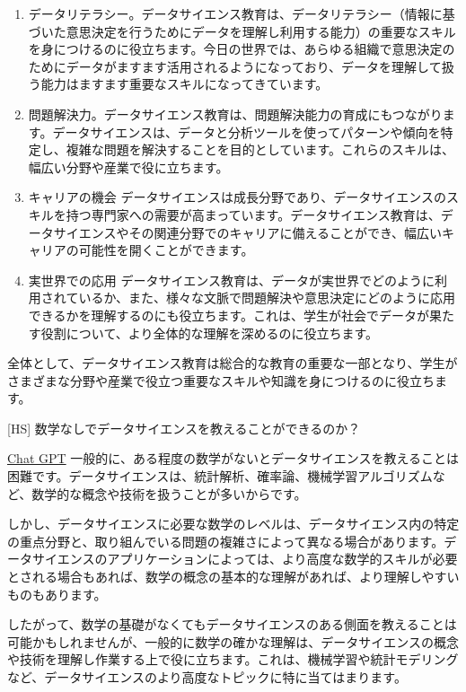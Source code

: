\documentclass[
]{book}
\theoremstyle{definition}
\theoremstyle{definition}
\theoremstyle{definition}
\theoremstyle{definition}
\theoremstyle{remark}
\begin{document}
\begin{enumerate}
\def\labelenumi{\arabic{enumi}.}
\item
  データリテラシー。データサイエンス教育は、データリテラシー（情報に基づいた意思決定を行うためにデータを理解し利用する能力）の重要なスキルを身につけるのに役立ちます。今日の世界では、あらゆる組織で意思決定のためにデータがますます活用されるようになっており、データを理解して扱う能力はますます重要なスキルになってきています。
\item
  問題解決力。データサイエンス教育は、問題解決能力の育成にもつながります。データサイエンスは、データと分析ツールを使ってパターンや傾向を特定し、複雑な問題を解決することを目的としています。これらのスキルは、幅広い分野や産業で役に立ちます。
\item
  キャリアの機会 データサイエンスは成長分野であり、データサイエンスのスキルを持つ専門家への需要が高まっています。データサイエンス教育は、データサイエンスやその関連分野でのキャリアに備えることができ、幅広いキャリアの可能性を開くことができます。
\item
  実世界での応用 データサイエンス教育は、データが実世界でどのように利用されているか、また、様々な文脈で問題解決や意思決定にどのように応用できるかを理解するのにも役立ちます。これは、学生が社会でデータが果たす役割について、より全体的な理解を深めるのに役立ちます。
\end{enumerate}

全体として、データサイエンス教育は総合的な教育の重要な一部となり、学生がさまざまな分野や産業で役立つ重要なスキルや知識を身につけるのに役立ちます。

{[}HS{]} 数学なしでデータサイエンスを教えることができるのか？

\protect\hyperlink{chatgpt}{Chat GPT} 一般的に、ある程度の数学がないとデータサイエンスを教えることは困難です。データサイエンスは、統計解析、確率論、機械学習アルゴリズムなど、数学的な概念や技術を扱うことが多いからです。

しかし、データサイエンスに必要な数学のレベルは、データサイエンス内の特定の重点分野と、取り組んでいる問題の複雑さによって異なる場合があります。データサイエンスのアプリケーションによっては、より高度な数学的スキルが必要とされる場合もあれば、数学の概念の基本的な理解があれば、より理解しやすいものもあります。

したがって、数学の基礎がなくてもデータサイエンスのある側面を教えることは可能かもしれませんが、一般的に数学の確かな理解は、データサイエンスの概念や技術を理解し作業する上で役に立ちます。これは、機械学習や統計モデリングなど、データサイエンスのより高度なトピックに特に当てはまります。
\end{document}
